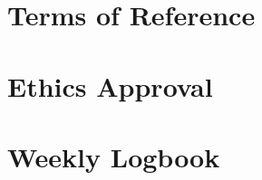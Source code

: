 \documentclass[11pt, twoside, a4paper]{report}
\begin{document}
\section{Terms of Reference}


\section{Ethics Approval}
\label{sec:ethics_approval}


\section{Weekly Logbook}
\raggedbottom

\flushbottom



\todos

\end{document}
